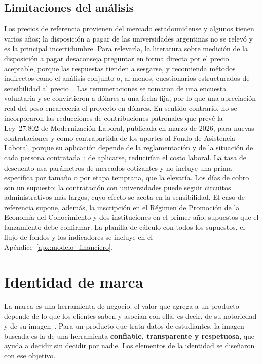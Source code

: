 \subsection{Limitaciones del análisis}

Los precios de referencia provienen del mercado estadounidense y algunos tienen varios años; la disposición a pagar de las universidades argentinas no se relevó y es la principal incertidumbre. Para relevarla, la literatura sobre medición de la disposición a pagar desaconseja preguntar en forma directa por el precio aceptable, porque las respuestas tienden a sesgarse, y recomienda métodos indirectos como el análisis conjunto o, al menos, cuestionarios estructurados de sensibilidad al precio~\parencite{Breidert2006}. Las remuneraciones se tomaron de una encuesta voluntaria y se convirtieron a dólares a una fecha fija, por lo que una apreciación real del peso encarecería el proyecto en dólares. En sentido contrario, no se incorporaron las reducciones de contribuciones patronales que prevé la Ley~27.802 de Modernización Laboral, publicada en marzo de 2026, para nuevas contrataciones y como contrapartida de los aportes al Fondo de Asistencia Laboral, porque su aplicación depende de la reglamentación y de la situación de cada persona contratada~\parencite{KPMG2026Ley27802}; de aplicarse, reducirían el costo laboral. La tasa de descuento usa parámetros de mercados cotizantes y no incluye una prima específica por tamaño o por etapa temprana, que la elevaría. Los días de cobro son un supuesto: la contratación con universidades puede seguir circuitos administrativos más largos, cuyo efecto se acota en la sensibilidad. El caso de referencia supone, además, la inscripción en el Régimen de Promoción de la Economía del Conocimiento y dos instituciones en el primer año, supuestos que el lanzamiento debe confirmar. La planilla de cálculo con todos los supuestos, el flujo de fondos y los indicadores se incluye en el Apéndice~\ref{apx:modelo_financiero}.

\section{Identidad de marca}
\label{sec:neg_marca}

La marca es una herramienta de negocio: el valor que agrega a un producto depende de lo que los clientes saben y asocian con ella, es decir, de su notoriedad y de su imagen~\parencite{Keller1993}. Para un producto que trata datos de estudiantes, la imagen buscada es la de una herramienta \textbf{confiable, transparente y respetuosa}, que ayuda a decidir sin decidir por nadie. Los elementos de la identidad se diseñaron con ese objetivo.

